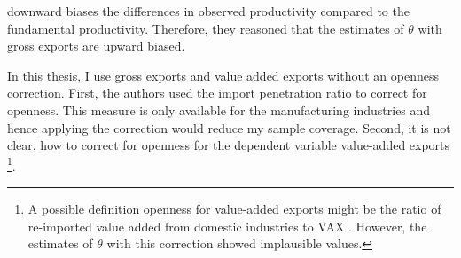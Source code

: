     downward biases  the differences in observed productivity compared to the fundamental productivity.
     Therefore, they reasoned that the estimates of  $\theta$ with gross exports are upward biased. \par
    In this thesis, I use gross exports and value added exports without an openness correction.
     First, the authors used the import penetration ratio to correct for openness.
     This measure is only available for the manufacturing industries and hence applying the correction would reduce my sample coverage.
      Second, it is not clear, how to correct for openness for the dependent variable value-added exports  \footnote{ A possible definition openness for value-added exports might be the ratio of re-imported value added from domestic industries to VAX .
      However,  the estimates of $\theta$ with this correction showed implausible values.}.

